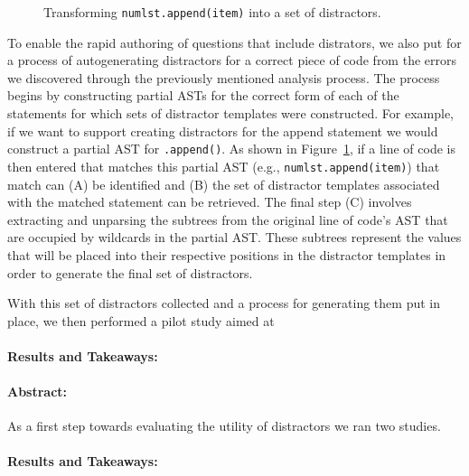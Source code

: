 \documentclass[]{acmart}
\renewcommand{\boxed}[1]{\text{\fboxsep=.2em\fbox{#1}}}
\begin{document}
\begin{figure}[t]
    \centering
    \resizebox{0.95\columnwidth}{!}{
    }
    \caption{Transforming \texttt{numlst.append(item)} into a set of distractors.}
    \label{fig:appendastmatchesed}
\end{figure}

To enable the rapid authoring of questions that include distrators, we also 
put for a process of autogenerating distractors for a correct piece of code 
from the errors we discovered through the previously mentioned analysis process.
The process begins by constructing partial ASTs for the correct form of each of
the statements for which sets of distractor templates were constructed.  For
example, if we want to support creating distractors for the append statement we
would construct a partial AST for \texttt{\boxed{1}.append(\boxed{2})}.  As
shown in Figure~\ref{fig:appendastmatchesed}, if a line of code is then entered
that matches this partial AST (e.g., \texttt{numlst.append(item)}) that match
can (A) be identified and (B) the set of distractor templates associated with
the matched statement can be retrieved. The final step (C) involves extracting
and unparsing the subtrees from the original line of code's AST that are
occupied by wildcards in the partial AST. These subtrees represent the values
that will be placed into their respective positions in the distractor templates
in order to generate the final set of distractors.

With this set of distractors collected and a process for generating them put in
place, we then performed a pilot study aimed at 

\paragraph{Results and Takeaways:}


\label{sec:eval}

\paragraph{Abstract:} As a first step towards evaluating the utility of
distractors we ran two studies. 

\paragraph{Results and Takeaways:}
\end{document}
